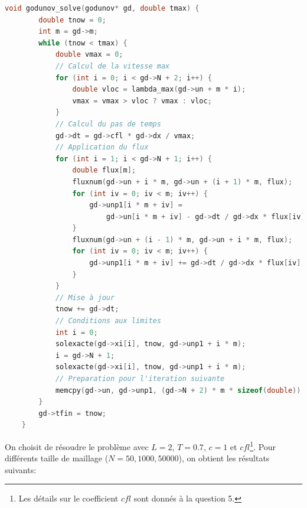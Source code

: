 \documentclass[
	french,
	11pt, %
]{fphw}
\begin{document}
\begin{itemize}
	\begin{lstlisting}[language=C,breaklines]
	void godunov_solve(godunov* gd, double tmax) {
		double tnow = 0;
		int m = gd->m;
		while (tnow < tmax) {
			double vmax = 0;
			// Calcul de la vitesse max
			for (int i = 0; i < gd->N + 2; i++) {
				double vloc = lambda_max(gd->un + m * i);
				vmax = vmax > vloc ? vmax : vloc;
			}
			// Calcul du pas de temps
			gd->dt = gd->cfl * gd->dx / vmax;
			// Application du flux
			for (int i = 1; i < gd->N + 1; i++) {
				double flux[m];
				fluxnum(gd->un + i * m, gd->un + (i + 1) * m, flux);
				for (int iv = 0; iv < m; iv++) {
					gd->unp1[i * m + iv] =
						gd->un[i * m + iv] - gd->dt / gd->dx * flux[iv];
				} 
				fluxnum(gd->un + (i - 1) * m, gd->un + i * m, flux);
				for (int iv = 0; iv < m; iv++) {
					gd->unp1[i * m + iv] += gd->dt / gd->dx * flux[iv];
				}
			}
			// Mise à jour
			tnow += gd->dt;
			// Conditions aux limites
			int i = 0;
			solexacte(gd->xi[i], tnow, gd->unp1 + i * m);
			i = gd->N + 1;
			solexacte(gd->xi[i], tnow, gd->unp1 + i * m);
			// Preparation pour l'iteration suivante
			memcpy(gd->un, gd->unp1, (gd->N + 2) * m * sizeof(double));
		}
		gd->tfin = tnow;
	}		
	\end{lstlisting}	
\end{itemize}

On choisit de résoudre le problème avec $L = 2$, $T=0.7$, $c=1$ et $cfl$\footnote{Les détails sur le coefficient $cfl$ sont donnés à la question 5.}. Pour différents taille de maillage ($N=50, 1000, 50000$), on obtient les résultats suivants:
\end{document}
